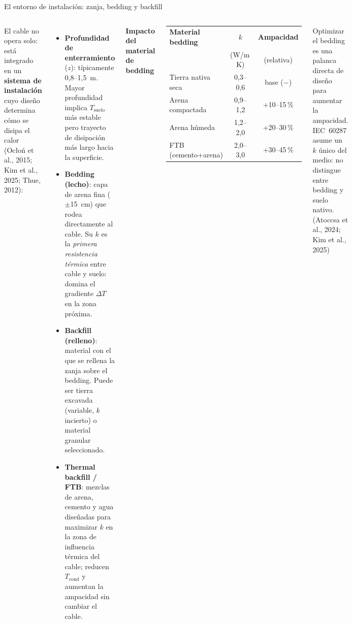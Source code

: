 \documentclass[aspectratio=169]{beamer}
\newcommand{\refcite}[1]{{\footnotesize\color{gray!70!black} #1}}
\begin{document}
\begin{frame}{El entorno de instalación: zanja, bedding y backfill}
\begin{columns}[T]
\justifying\small
El cable no opera solo: está integrado en un \textbf{sistema de instalación}
cuyo diseño determina cómo se disipa el calor
\refcite{(Ocłoń et al., 2015; Kim et al., 2025; Thue, 2012)}:
\begin{itemize}[leftmargin=*]\scriptsize
    \item \textbf{Profundidad de enterramiento} ($z$): típicamente 0{,}8--1{,}5~m.
          Mayor profundidad implica $T_\text{suelo}$ más estable pero trayecto de
          disipación más largo hacia la superficie.
    \item \textbf{Bedding (lecho)}: capa de arena fina ($\pm$15~cm) que rodea
          directamente al cable. Su $k$ es la \emph{primera resistencia térmica}
          entre cable y suelo: domina el gradiente $\Delta T$ en la zona próxima.
    \item \textbf{Backfill (relleno)}: material con el que se rellena la zanja
          sobre el bedding. Puede ser tierra excavada (variable, $k$ incierto)
          o material granular seleccionado.
    \item \textbf{Thermal backfill / FTB}: mezclas de arena, cemento y agua
          diseñadas para maximizar $k$ en la zona de influencia térmica del cable;
          reducen $T_\text{cond}$ y aumentan la ampacidad sin cambiar el cable.
\end{itemize}
\small\textbf{Impacto del material de bedding}
\vspace{0.15em}
\begin{center}\scriptsize
\begin{tabular}{lcc}
\toprule
\textbf{Material bedding}   & \textbf{$k$}  & \textbf{Ampacidad} \\
                             & (W/m\,K)      & (relativa) \\
\midrule
Tierra nativa seca           & 0{,}3--0{,}6  & base ($-$) \\
Arena compactada             & 0{,}9--1{,}2  & +10--15\,\% \\
Arena húmeda                 & 1{,}2--2{,}0  & +20--30\,\% \\
FTB (cemento+arena)          & 2{,}0--3{,}0  & +30--45\,\% \\
\bottomrule
\end{tabular}
\end{center}
\vspace{0.2em}
\begin{exampleblock}{}\scriptsize
Optimizar el bedding es una palanca directa de diseño para
aumentar la ampacidad. IEC~60287 asume un $k$ único del medio:
no distingue entre bedding y suelo nativo.
\refcite{(Atoccsa et al., 2024; Kim et al., 2025)}
\end{exampleblock}
\end{columns}
\end{frame}
\end{document}
